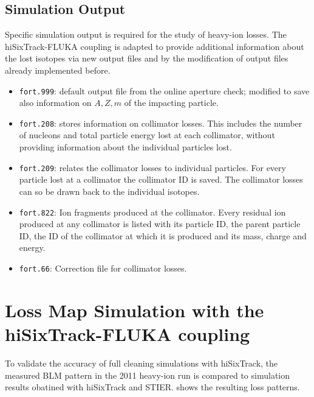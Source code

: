 \subsection{Simulation Output}
Specific simulation output is required for the study of heavy-ion losses. The hiSixTrack-FLUKA coupling is adapted to provide additional information about the lost isotopes via new output files and by the modification of output files already implemented before.

\begin{itemize}
  \item \texttt{fort.999}: default output file from the online aperture check; modified to save also information on $A,Z,m$ of the impacting particle.
  \item \texttt{fort.208}: stores information on collimator losses. This includes the number of nucleons and total particle energy lost at each collimator, without providing information about the individual particles lost. 
  \item \texttt{fort.209}: relates the collimator losses to individual particles. For every particle lost at a collimator the collimator ID is saved. The collimator losses can so be drawn back to the individual isotopes.
  \item \texttt{fort.822}: Ion fragments produced at the collimator. Every residual ion produced at any collimator is listed with its particle ID, the parent particle ID, the ID of the collimator at which it is produced and its mass, charge and energy.
  \item \texttt{fort.66}: Correction file for collimator losses. 
\end{itemize}




\section{Loss Map Simulation with the hiSixTrack-FLUKA coupling}


To validate the accuracy of full cleaning simulations with hiSixTrack, the measured BLM pattern in the 2011 heavy-ion run is compared to simulation results obatined with hiSixTrack and STIER.  shows the resulting loss patterns. 


